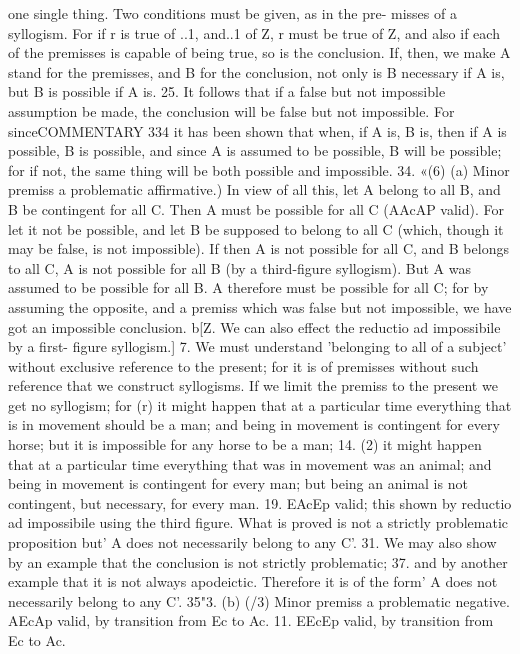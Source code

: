 {{{{{one single thing. Two conditions must be given, as in the pre-
misses of a syllogism. For if r is true of ..1, and..1 of Z, r must be
true of Z, and also if each of the premisses is capable of being
true, so is the conclusion. If, then, we make A stand for the
premisses, and B for the conclusion, not only is B necessary if A
is, but B is possible if A is.
25. It follows that if a false but not impossible assumption be
made, the conclusion will be false but not impossible. For sinceCOMMENTARY
334
it has been shown that when, if A is, B is, then if A is possible,
B is possible, and since A is assumed to be possible, B will be
possible; for if not, the same thing will be both possible and
impossible.
34. «(6) (a) Minor premiss a problematic affirmative.) In view
of all this, let A belong to all B, and B be contingent for all C.
Then A must be possible for all C (AAcAP valid). For let it not be
possible, and let B be supposed to belong to all C (which, though
it may be false, is not impossible). If then A is not possible for
all C, and B belongs to all C, A is not possible for all B (by a
third-figure syllogism). But A was assumed to be possible for all
B. A therefore must be possible for all C; for by assuming the
opposite, and a premiss which was false but not impossible, we
have got an impossible conclusion.
b[Z. We can also effect the reductio ad impossibile by a first-
figure syllogism.]
7. We must understand 'belonging to all of a subject' without
exclusive reference to the present; for it is of premisses without
such reference that we construct syllogisms. If we limit the
premiss to the present we get no syllogism; for (r) it might happen
that at a particular time everything that is in movement should
be a man; and being in movement is contingent for every horse;
but it is impossible for any horse to be a man;
14. (2) it might happen that at a particular time everything
that was in movement was an animal; and being in movement is
contingent for every man; but being an animal is not contingent,
but necessary, for every man.
19. EAcEp valid; this shown by reductio ad impossibile using
the third figure. What is proved is not a strictly problematic
proposition but' A does not necessarily belong to any C'.
31. We may also show by an example that the conclusion is not
strictly problematic;
37. and by another example that it is not always apodeictic.
Therefore it is of the form' A does not necessarily belong to any C'.
35"3. (b) (/3) Minor premiss a problematic negative. AEcAp
valid, by transition from Ec to Ac.
11. EEcEp valid, by transition from Ec to Ac.
}}}}}
